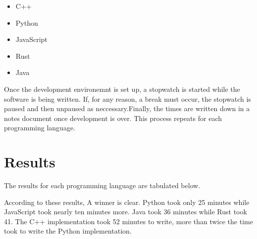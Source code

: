 \documentclass{article}
\begin{document}
\begin{itemize}
        \item C++
        \item Python
        \item JavaScript
        \item Rust
        \item Java
\end{itemize}

Once the development environemnt is set up, a stopwatch is started while the software is being written. If, for any reason, a break must occur, the stopwatch is paused and then unpaused as neccessary.Finally, the times are written down in a notes document once development is over. This process repeats for each programming language. 

\section{Results}

The results for each programming language are tabulated below.
\begin{center}
\begin{adjustbox}{center}
\end{adjustbox}
\end{center}

According to these results, A winner is clear. Python took only 25 minutes while JavaScript took nearly ten minutes more. Java took 36 minutes while Rust took 41. The C++ implementation took 52 minutes to write, more than twice the time took to write the Python implementation.
\end{document}
